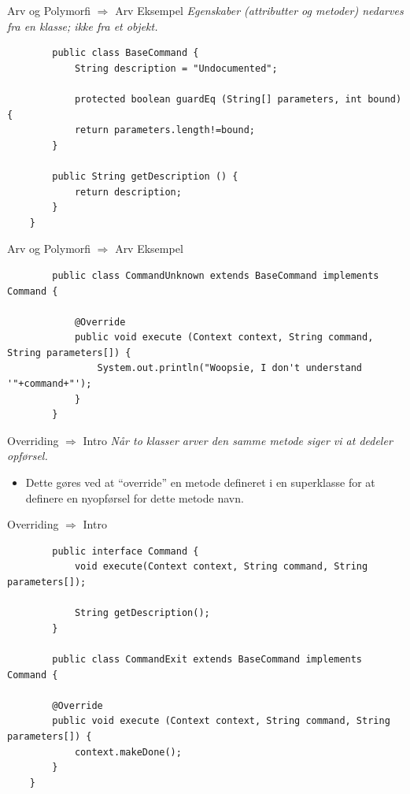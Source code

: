 \documentclass[10pt,aspectratio=1610]{beamer}
\begin{document}
\begin{frame}[fragile]{Arv og Polymorfi $\Rightarrow$ Arv Eksempel}
    \textit{Egenskaber (attributter og metoder) nedarves fra en klasse; ikke fra et objekt.}
    \begin{lstlisting}
        public class BaseCommand {
            String description = "Undocumented";
            
            protected boolean guardEq (String[] parameters, int bound) {
            return parameters.length!=bound;
        }
        
        public String getDescription () {
            return description;
        }
    }
    \end{lstlisting}
\end{frame}





\begin{frame}[fragile]{Arv og Polymorfi $\Rightarrow$ Arv Eksempel}
   \begin{lstlisting}
        public class CommandUnknown extends BaseCommand implements Command {
        
            @Override
            public void execute (Context context, String command, String parameters[]) {
                System.out.println("Woopsie, I don't understand '"+command+"');
            }
        }
    \end{lstlisting}
\end{frame}




\begin{frame}{Overriding $\Rightarrow$ Intro}
    \textit{Når to klasser arver den samme metode siger vi at dedeler opførsel.}
    \begin{itemize}
        \item Dette gøres ved at “override” en metode defineret i en superklasse for at definere en nyopførsel for dette metode navn.
    \end{itemize}
\end{frame}

\begin{frame}[fragile]{Overriding $\Rightarrow$ Intro}

     \begin{lstlisting}
        public interface Command {
            void execute(Context context, String command, String parameters[]);
            
            String getDescription();
        }
        
        public class CommandExit extends BaseCommand implements Command {
        
        @Override
        public void execute (Context context, String command, String parameters[]) {
            context.makeDone();
        }
    }
    \end{lstlisting}
\end{frame}
\end{document}
